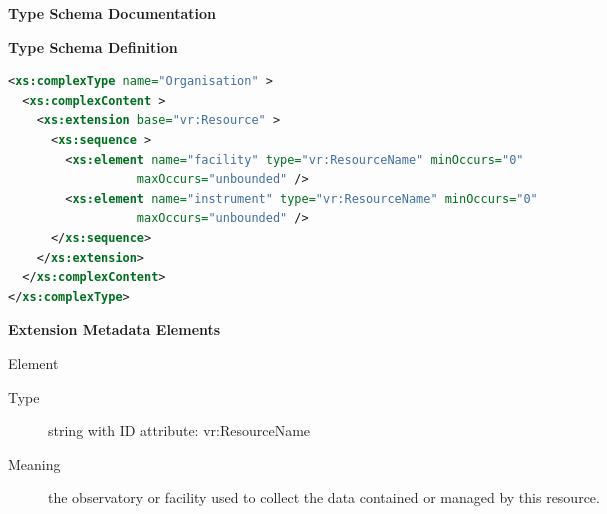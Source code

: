 \documentclass[11pt,a4paper]{ivoa}
\begin{document}
\begin{generated}
\begingroup
      	\renewcommand*\descriptionlabel[1]{%
      	\hbox to 5.5em{\emph{#1}\hfil}}\vspace{2ex}\noindent\textbf{ Type Schema Documentation}




\vspace{1ex}\noindent\textbf{ Type Schema Definition}

\begin{lstlisting}[language=XML,basicstyle=\footnotesize]
<xs:complexType name="Organisation" >
  <xs:complexContent >
    <xs:extension base="vr:Resource" >
      <xs:sequence >
        <xs:element name="facility" type="vr:ResourceName" minOccurs="0"
                  maxOccurs="unbounded" />
        <xs:element name="instrument" type="vr:ResourceName" minOccurs="0"
                  maxOccurs="unbounded" />
      </xs:sequence>
    </xs:extension>
  </xs:complexContent>
</xs:complexType>
\end{lstlisting}

\vspace{0.5ex}\noindent\textbf{ Extension Metadata Elements}

\begingroup\small\begin{bigdescription}\item[Element \xmlel{facility}]
\begin{description}
\item[Type] string with ID attribute: vr:ResourceName
\item[Meaning] 
                       the observatory or facility used to collect the data 
                       contained or managed by this resource.  
                     

\end{description}
\end{bigdescription}
\end{generated}
\end{document}
